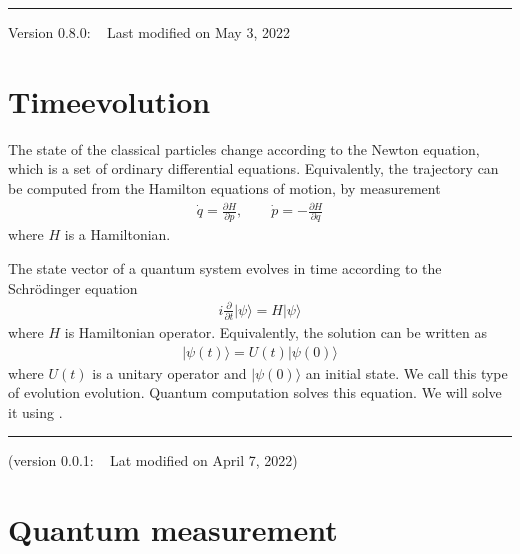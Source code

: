 \documentclass[letterpaper,10pt,english]{jupyterBook}
\begin{document}
\bigskip\hrule\bigskip


\sphinxAtStartPar
Version 0.8.0:   Last modified on May 3, 2022

\sphinxstepscope


\section{Time\sphinxhyphen{}evolution}
\label{\detokenize{qmsummary/evolution:time-evolution}}\label{\detokenize{qmsummary/evolution:chap-time-evolution}}\label{\detokenize{qmsummary/evolution::doc}}
\sphinxAtStartPar
The state of the classical particles change according to the Newton equation, which is a set of ordinary differential equations. Equivalently,  the trajectory can be computed from the Hamilton equations of motion, by measurement
\begin{equation*}
\begin{split}
\dot{q} = \frac{\partial H}{\partial p}, \qquad \dot{p} = -\frac{\partial H}{\partial q}
\end{split}
\end{equation*}
\sphinxAtStartPar
where \(H\) is a Hamiltonian.

\sphinxAtStartPar
The state vector of a quantum system evolves in time according to the Schrödinger equation
\begin{equation*}
\begin{split}
i \frac{\partial}{\partial t} |\psi\rangle = H |\psi\rangle
\end{split}
\end{equation*}
\sphinxAtStartPar
where \(H\) is Hamiltonian operator.  Equivalently,  the solution can be written as
\begin{equation*}
\begin{split}
|\psi(t)\rangle = U(t) |\psi(0)\rangle
\end{split}
\end{equation*}
\sphinxAtStartPar
where \(U(t)\) is a unitary operator and \(|\psi(0)\rangle\) an initial state.  We call this type of evolution  evolution. Quantum computation solves this equation.  We will solve it using .


\bigskip\hrule\bigskip


\sphinxAtStartPar
(version 0.0.1:     Lat modified on April 7, 2022)

\sphinxstepscope


\section{Quantum measurement}
\label{\detokenize{qmsummary/measurement:quantum-measurement}}\label{\detokenize{qmsummary/measurement:chap-measurement}}\label{\detokenize{qmsummary/measurement::doc}}
\sphinxAtStartPar
{}
\end{document}
